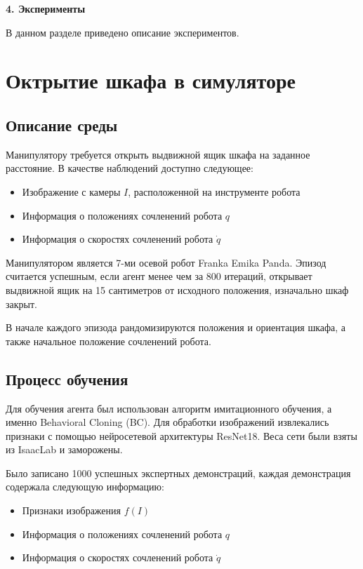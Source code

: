 \newpage
\begin{center}
  \textbf{\large 4. Эксперименты}
\end{center}

    В данном разделе приведено описание экспериментов.

    \section{Октрытие шкафа в симуляторе}

        \subsection{Описание среды}

            Манипулятору требуется открыть выдвижной ящик шкафа на заданное расстояние. В качестве наблюдений доступно следующее:

            \begin{itemize}
                \item Изображение с камеры $I$, расположенной на инструменте робота
                \item Информация о положениях сочленений робота $q$
                \item Информация о скоростях сочленений робота $\dot{q}$
            \end{itemize}

            Манипулятором является 7-ми осевой робот Franka Emika Panda. Эпизод считается успешным, если агент менее чем за 800 итераций, открывает выдвижной ящик на 15 сантиметров от исходного положения, изначально шкаф закрыт. 
            
            В начале каждого эпизода рандомизируются положения и ориентация шкафа, а также начальное положение сочленений робота. 

        \subsection{Процесс обучения}

            Для обучения агента был использован алгоритм имитационного обучения, а именно Behavioral Cloning (BC). Для обработки изображений извлекались признаки с помощью нейросетевой архитектуры ResNet18. Веса сети были взяты из IsaacLab и заморожены. 
            
            Было записано 1000 успешных экспертных демонстраций, каждая демонстрация содержала следующую информацию:~\begin{itemize}
                \item Признаки изображения $f(I)$
                \item Информация о положениях сочленений робота $q$
                \item Информация о скоростях сочленений робота $\dot{q}$
            \end{itemize}

